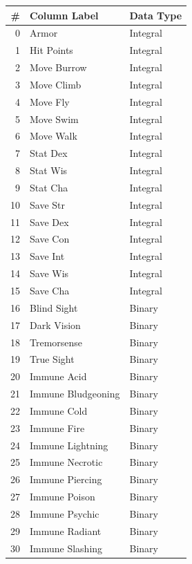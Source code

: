 \documentclass{article}
\begin{document}
\begin{table}[!htbp] \centering 
	\caption{\bfseries Final Dataset}
	\label{tab:final-dataset}
\begin{scriptsize}
\begin{minipage}[b]{0.45\linewidth}\centering
\begin{longtable}[]{@{}rll@{}}
	\toprule
	\# & Column Label & Data Type \\
	\midrule
	\endhead
	0 & Armor & Integral \\
	1 & Hit Points & Integral \\
	2 & Move Burrow & Integral \\
	3 & Move Climb & Integral \\
	4 & Move Fly & Integral \\
	5 & Move Swim & Integral \\
	6 & Move Walk & Integral \\
	7 & Stat Dex & Integral \\
	8 & Stat Wis & Integral \\
	9 & Stat Cha & Integral \\
	10 & Save Str & Integral \\
	11 & Save Dex & Integral \\
	12 & Save Con & Integral \\
	13 & Save Int & Integral \\
	14 & Save Wis & Integral \\
	15 & Save Cha & Integral \\
	16 & Blind Sight & Binary \\
	17 & Dark Vision & Binary \\
	18 & Tremorsense & Binary \\
	19 & True Sight & Binary \\
	20 & Immune Acid & Binary \\
	21 & Immune Bludgeoning & Binary \\
	22 & Immune Cold & Binary \\
	23 & Immune Fire & Binary \\
	24 & Immune Lightning & Binary \\
	25 & Immune Necrotic & Binary \\
	26 & Immune Piercing & Binary \\
	27 & Immune Poison & Binary \\
	28 & Immune Psychic & Binary \\
	29 & Immune Radiant & Binary \\
	30 & Immune Slashing & Binary \\

\end{longtable}
\end{minipage}
\end{scriptsize}
\end{table}
\end{document}
